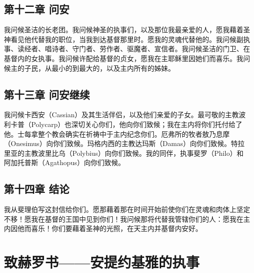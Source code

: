
\subsection{第十二章  问安}

我问候圣洁的长老团。我问候神圣的执事们，以及那位我最亲爱的人，愿我藉着圣神看见他代替我的职位，当我到达基督那里时。愿我的灵魂代替他的。我问候副执事、读经者、唱诗者、守门者、劳作者、驱魔者、宣信者。我问候圣洁的门卫、在基督内的女执事。我问候许配给基督的贞女，愿我在主耶稣里因她们而喜乐。我问候主的子民，从最小的到最大的，以及主内所有的姊妹。\par


\subsection{第十三章  问安继续}

我问候卡西安（Cassian）及其生活伴侣，以及他们亲爱的子女。最可敬的主教波利卡普（Polycarp）也深切关心你们，他向你们致候；我在主内将你们托付给了他。士每拿整个教会确实在祈祷中于主内纪念你们。厄弗所的牧者敖乃息摩（Onesimus）向你们致候。玛格内西的主教达玛斯（Damas）向你们致候。特拉里亚的主教波里比乌（Polybius）向你们致候。我的同伴，执事斐罗（Philo）和阿加托普斯（Agathopus）向你们致候。\par


\subsection{第十四章 结论}

我从斐理伯写这封信给你们。愿那藉着那在时间开始前使你们在灵魂和肉体上坚定不移！愿我在基督的王国中见到你们！我问候那将代替我管辖你们的人：愿我在主内因他而喜乐！你们要藉着圣神的光照，在天主内并基督内安好。\par


\section{致赫罗书——安提约基雅的执事}

